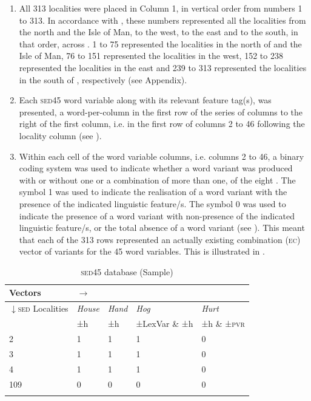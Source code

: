 {{{\begin{enumerate}
\item {All 313 localities were placed in Column 1, in vertical order from numbers 1 to 313. In accordance with \citet{Orton6271}, these numbers represented all the localities from the north and the Isle of Man, to the west, to the east and to the south, in that order, across . 1 to 75 represented the localities in the north of  and the Isle of Man, 76 to 151 represented the localities in the west, 152 to 238 represented the localities in the east and 239 to 313 represented the localities in the south of , respectively (see Appendix).}
\item {Each \textsc{sed45} word variable along with its relevant feature tag(s), was presented, a word-per-column in the first row of the series of columns to the right of the first column, i.e. in the first row of columns 2 to 46 following the locality column (see ).}
\item {Within each cell of the word variable columns, i.e. columns 2 to 46, a binary coding system was used to indicate whether a word variant was produced with or without one or a combination of more than one, of the eight . The symbol 1 was used to indicate the realisation of a word variant with the presence of the indicated linguistic feature/s. The symbol 0 was used to indicate the presence of a word variant with non-presence of the indicated linguistic feature/s, or the total absence of a word variant (see ). This meant that each of the 313 rows represented an actually existing combination (\textsc{ec}) vector of variants for the 45 word variables. This is illustrated in .}
\end{enumerate}

\begin{table}
\begin{tabular}{lllll}
\lsptoprule 
Vectors & \multicolumn{1}{l}{$\longrightarrow$}\\
\midrule 
$\downarrow$\textsc{sed} Localities \cellcolor{gray!35} & \emph{House} & \emph{Hand} & \emph{Hog} & \emph{Hurt} \\
 \cellcolor{gray!35} & ±h  & ±h & ±LexVar \& ±h & ±h \& ±\textsc{pvr} \\
 2 \cellcolor{gray!35} & 1 & 1 & 1 & 0 \\
 3 \cellcolor{gray!35} & 1 & 1 & 1 & 0 \\
 4 \cellcolor{gray!35} & 1 & 1 & 1 & 0 \\
109 \cellcolor{gray!35} & 0 & 0 & 0 & 0 \\
\lspbottomrule 
\end{tabular}
\caption{\textsc{sed45} database (Sample)}
\label{Table 3.9}
\end{table}

}}}
